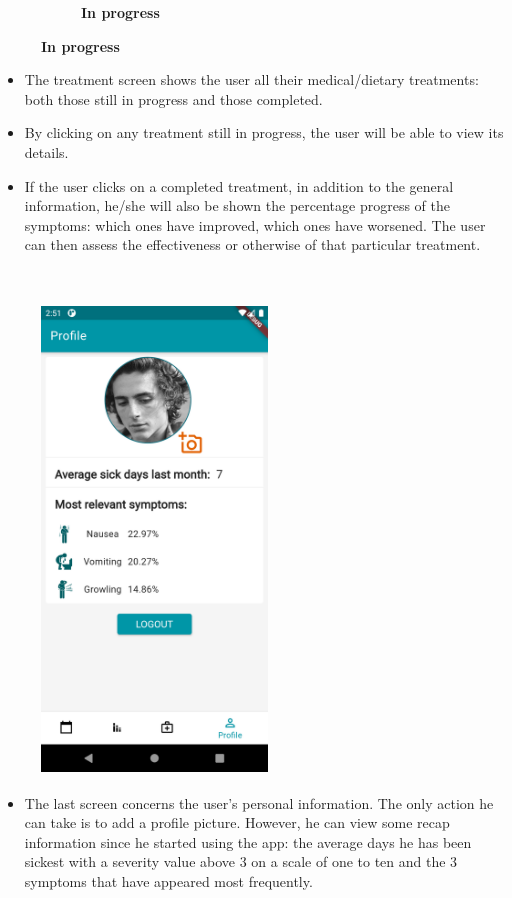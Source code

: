 \documentclass [12pt]{article}
\begin{document}
\begin{description}[leftmargin=1cm,rightmargin=1cm]
\begin{figure}[h!]
\begin{subfigure}[tr]{0.3\linewidth}
\caption{\textbf{In progress}}
\end{subfigure}
\hspace*{\fill}
\end{figure}
\begin{itemize}[•]
\item The treatment screen shows the user all their medical/dietary treatments: both those still in progress and those completed. 
\item By clicking on any treatment still in progress, the user will be able to view its details. 
\item If the user clicks on a completed treatment, in addition to the general information, he/she will also be shown the percentage progress of the symptoms: which ones have improved, which ones have worsened. The user can then assess the effectiveness or otherwise of that particular treatment. 
\end{itemize}
\clearpage

\item [ 7)Personal page]
\
\
\
\begin{figure}[h!]
\centering
\includegraphics[width=6cm,height=12.5cm]{PersonalPage.PNG}
\end{figure}
\begin{itemize}[•]
\item The last screen concerns the user's personal information. The only action he can take is to add a profile picture. However, he can view some recap information since he started using the app: the average days he has been sickest with a severity value above 3 on a scale of one to ten and the 3 symptoms that have appeared most frequently.
\end{itemize}
\end{description}
\end{document}
